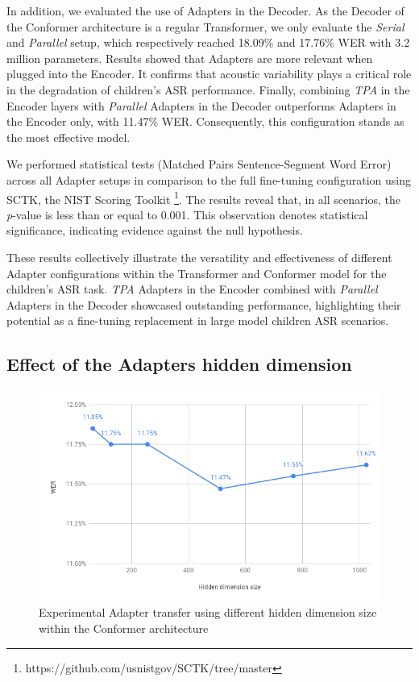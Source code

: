 In addition, we evaluated the use of  Adapters in the Decoder. As the Decoder of the Conformer architecture is a regular Transformer, we only evaluate the \textit{Serial} and \textit{Parallel} setup, which respectively reached 18.09\%  and 17.76\% \ac{WER} with 3.2 million parameters. Results showed that Adapters are more relevant when plugged into the Encoder. It confirms that acoustic variability plays a critical role in the degradation of children's \ac{ASR} performance. Finally, combining \textit{\ac{TPA}} in the Encoder layers with \textit{Parallel} Adapters in the Decoder outperforms Adapters in the Encoder only, with 11.47\% \ac{WER}. Consequently, this configuration stands as the most effective model. 

We performed statistical tests (Matched Pairs Sentence-Segment Word Error) across all Adapter setups in comparison to the full fine-tuning configuration using SCTK, the NIST Scoring Toolkit \footnote{https://github.com/usnistgov/SCTK/tree/master}. 
The results reveal that, in all scenarios, the \textit{p}-value is less than or equal to 0.001. This observation denotes statistical significance, indicating evidence against the null hypothesis. 

These results collectively illustrate the versatility and effectiveness of different Adapter configurations within the Transformer and  Conformer model for the children's \ac{ASR} task. \textit{\ac{TPA}} Adapters in the Encoder combined with \textit{Parallel} Adapters in the Decoder showcased outstanding performance, highlighting their potential as a fine-tuning replacement in large model children \ac{ASR} scenarios.

\subsection{Effect of the Adapters hidden dimension}
\begin{figure}
    \begin{center}
    \includegraphics[scale=0.5]{imgs/HiddenDimEXP.png}
    \caption{Experimental Adapter transfer using different hidden dimension size within the Conformer architecture }
    \label{fig:HiddenDim}    
\end{center}
    
\end{figure}


